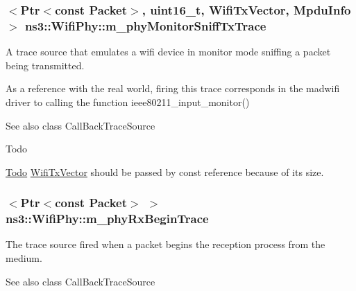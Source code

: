 \subsubsection[{\texorpdfstring{m\+\_\+phy\+Monitor\+Sniff\+Tx\+Trace}{m_phyMonitorSniffTxTrace}}]{$<${\bf Ptr}$<$const {\bf Packet}$>$, uint16\+\_\+t, {\bf Wifi\+Tx\+Vector}, {\bf Mpdu\+Info}$>$ ns3\+::\+Wifi\+Phy\+::m\+\_\+phy\+Monitor\+Sniff\+Tx\+Trace\hspace{0.3cm}{\ttfamily [private]}}\hypertarget{classns3_1_1WifiPhy_ab11e6362f76c35f9a4c467c6c7765861}{}\label{classns3_1_1WifiPhy_ab11e6362f76c35f9a4c467c6c7765861}
A trace source that emulates a wifi device in monitor mode sniffing a packet being transmitted.

As a reference with the real world, firing this trace corresponds in the madwifi driver to calling the function ieee80211\+\_\+input\+\_\+monitor()

\begin{DoxySeeAlso}{See also}
class Call\+Back\+Trace\+Source 
\end{DoxySeeAlso}
\begin{DoxyRefDesc}{Todo}
\item[\hyperlink{todo__todo000179}{Todo}]\hyperlink{classns3_1_1WifiTxVector}{Wifi\+Tx\+Vector} should be passed by const reference because of its size. \end{DoxyRefDesc}
\subsubsection[{\texorpdfstring{m\+\_\+phy\+Rx\+Begin\+Trace}{m_phyRxBeginTrace}}]{$<${\bf Ptr}$<$const {\bf Packet}$>$ $>$ ns3\+::\+Wifi\+Phy\+::m\+\_\+phy\+Rx\+Begin\+Trace\hspace{0.3cm}{\ttfamily [private]}}\hypertarget{classns3_1_1WifiPhy_ac33ef626eeaa5283e7497bbbc8591a86}{}\label{classns3_1_1WifiPhy_ac33ef626eeaa5283e7497bbbc8591a86}
The trace source fired when a packet begins the reception process from the medium.

\begin{DoxySeeAlso}{See also}
class Call\+Back\+Trace\+Source 
\end{DoxySeeAlso}
